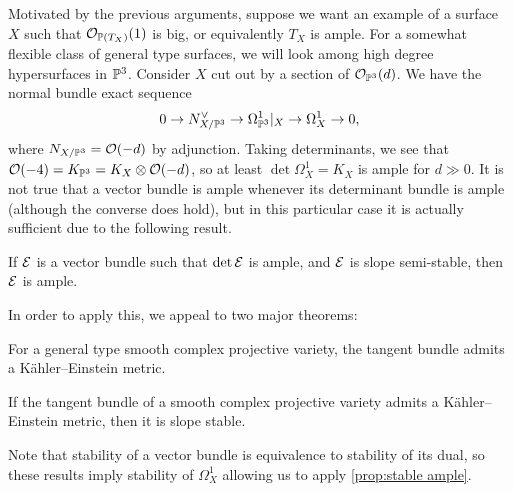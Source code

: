 Motivated by the previous arguments, suppose we want an example of a surface $X$
such that $\O_{\P(T_X)}(1)$ is big, or equivalently $T_X$ is ample. For a
somewhat flexible class of general type surfaces, we will look among high degree
hypersurfaces in $\P^3$. Consider $X$ cut out by a section of $\O_{\P^3}(d)$. We
have the normal bundle exact sequence
\begin{equation*}
    0 \to N_{X/\P^3}^\vee \to \Omega^1_{\P^3}|_X \to \Omega^1_X \to 0,
\end{equation*}
where $N_{X/\P^3}=\O(-d)$ by adjunction. Taking determinants, we see that
$\O(-4)=K_{\P^3}=K_X\otimes\O(-d)$, so at least $\det\Omega^1_X=K_X$ is ample
for $d\gg0$. It is not true that a vector bundle is ample whenever its
determinant bundle is ample (although the converse does hold), %
but in this particular case it is actually sufficient due to the following
result.

\begin{proposition}\label{prop:stable ample}
    If $\calE$ is a vector bundle such that $\det\calE$ is ample, and $\calE$ is
    slope semi-stable, then $\calE$ is ample.
\end{proposition}


In order to apply this, we appeal to two major theorems:

\begin{theorem}
    For a general type smooth complex projective variety, the tangent bundle
    admits a K\"ahler--Einstein metric.
\end{theorem}

\begin{theorem}
    If the tangent bundle of a smooth complex projective variety admits a
    K\"ahler--Einstein metric, then it is slope stable.
\end{theorem}

Note that stability of a vector bundle is equivalence to stability of its dual,
so these results imply stability of $\Omega^1_X$ allowing us to apply
\cref{prop:stable ample}.






